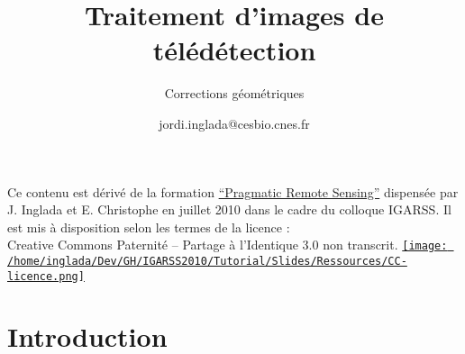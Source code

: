 \documentclass[compress,handout]{beamer}
\title{Traitement d'images de télédétection}
\subtitle{Corrections géométriques}
\author
{jordi.inglada@cesbio.cnes.fr}
\institute[Cesbio] %
{\textsc{Centre d'Études Spatiales de la Biosphère, Toulouse, France}}
\date{}
\begin{document}
\begin{frame}
  \titlepage
  \begin{center}
{\tiny Ce contenu est dérivé de la formation \href{http://www.orfeo-toolbox.org/packages/PragmaticRemoteSensing-handout.pdf}{``Pragmatic Remote
  Sensing''} dispensée par J. Inglada et E. Christophe en juillet 2010
  dans le cadre du colloque IGARSS. Il est mis à disposition selon les termes de la licence :\\
Creative Commons Paternité – Partage à l’Identique 3.0 non transcrit.} \href{http://creativecommons.org/licenses/by-sa/3.0/}{\texttt{[image: /home/inglada/Dev/GH/IGARSS2010/Tutorial/Slides/Ressources/CC-licence.png]}}    
  \end{center}
\end{frame}


\section*{Introduction}
\end{document}
